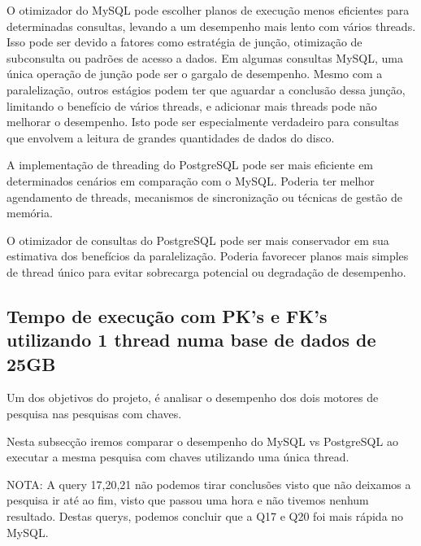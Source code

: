 \documentclass{article}
\begin{document}
  O otimizador do MySQL pode escolher planos de execução menos eficientes para determinadas consultas, levando a um desempenho mais lento com vários threads. Isso pode ser devido a fatores como estratégia de junção, otimização de subconsulta ou padrões de acesso a dados. Em algumas consultas MySQL, uma única operação de junção pode ser o gargalo de desempenho. Mesmo com a paralelização, outros estágios podem ter que aguardar a conclusão dessa junção, limitando o benefício de vários threads, e adicionar mais threads pode não melhorar o desempenho. Isto pode ser especialmente verdadeiro para consultas que envolvem a leitura de grandes quantidades de dados do disco.

  A implementação de threading do PostgreSQL pode ser mais eficiente em determinados cenários em comparação com o MySQL. Poderia ter melhor agendamento de threads, mecanismos de sincronização ou técnicas de gestão de memória.

  O otimizador de consultas do PostgreSQL pode ser mais conservador em sua estimativa dos benefícios da paralelização. Poderia favorecer planos mais simples de thread único para evitar sobrecarga potencial ou degradação de desempenho.






\clearpage
\subsection{Tempo de execução com PK's e FK's utilizando 1 thread numa base
de dados de 25GB}
Um dos objetivos do projeto, é analisar o desempenho dos dois motores de pesquisa nas pesquisas com chaves.

Nesta subsecção iremos comparar o desempenho do MySQL vs PostgreSQL ao executar a mesma pesquisa com chaves utilizando uma única thread.


NOTA: A query 17,20,21 não podemos tirar conclusões visto que não deixamos a pesquisa ir até ao fim, visto que passou uma hora e não tivemos nenhum resultado. Destas querys, podemos concluir que a Q17 e Q20 foi mais rápida no MySQL.
\end{document}
